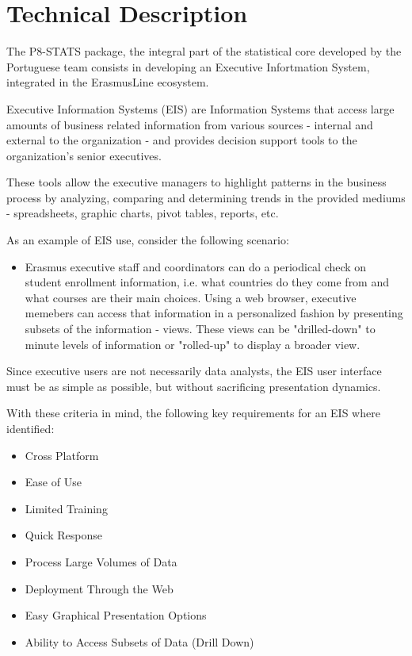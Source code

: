 \chapter{Technical Description} \label{ch:technical}

The P8-STATS package, the integral part of the statistical core developed by the
Portuguese team consists in developing an Executive Infortmation System,
integrated in the ErasmusLine ecosystem.

Executive Information Systems (EIS) are Information Systems that access large
amounts of business related information from various sources - internal and
external to the organization - and provides decision support tools to the
organization's senior executives.

These tools allow the executive managers to highlight patterns in the
business process by analyzing, comparing and determining trends in the provided
mediums - spreadsheets, graphic charts, pivot tables, reports, etc.

As an example of EIS use, consider the following scenario:

\begin{itemize}
\item[] Erasmus executive staff and coordinators can do a periodical check on
student enrollment information, i.e. what countries do they come from and what courses
are their main choices. Using a web browser, executive memebers can access that
information in a personalized fashion by presenting subsets of the information -
views. These views can be "drilled-down" to minute levels of information or
"rolled-up" to display a broader view.
\end{itemize}

Since executive users are not necessarily data analysts, the EIS user interface
must be as simple as possible, but without sacrificing presentation dynamics.

With these criteria in mind, the following key requirements for an EIS where
identified\cite{eis:psu}:

\begin{itemize}
  \item Cross Platform
  \item Ease of Use
  \item Limited Training
  \item Quick Response
  \item Process Large Volumes of Data
  \item Deployment Through the Web
  \item Easy Graphical Presentation Options
  \item Ability to Access Subsets of Data (Drill Down)
\end{itemize}

